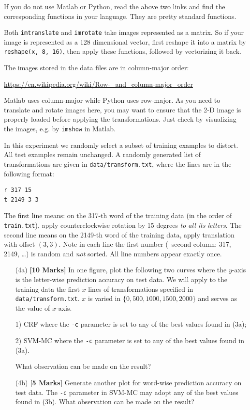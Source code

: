 \documentclass[11pt]{report}
\begin{document}
If you do not use Matlab or Python, read the above two links and find the corresponding functions in your language.  
They are pretty standard functions.	

Both \verb#imtranslate# and \verb#imrotate# take images represented as a matrix.
So if your image is represented as a 128 dimensional vector,
first reshape it into a matrix by \verb#reshape(x, 8, 16)#,
then apply these functions,
followed by vectorizing it back.

The images stored in the data files are in column-major order:

\href{https://en.wikipedia.org/wiki/Row-_and_column-major_order}{https://en.wikipedia.org/wiki/Row-\_and\_column-major\_order}

Matlab uses column-major while Python uses row-major.
As you need to translate and rotate images here, 
you may want to ensure that the 2-D image is properly loaded before applying the transformations.  
Just check by visualizing the images, e.g. by \verb#imshow# in Matlab.	

In this experiment
we randomly select a subset of training examples to distort.
All test examples remain unchanged.
A randomly generated list of transformations are given in \verb#data/transform.txt#, where the lines are in the following format:
%
\begin{verbatim}
r 317 15
t 2149 3 3
\end{verbatim}
The first line means: on the 317-th word of the training data (in the order of \verb#train.txt#),
apply counterclockwise rotation by 15 degrees \emph{to all its letters}.
The second line means on the 2149-th word of the training data, apply translation with offset $(3,3)$.
Note in each line the first number (\ie\ second column: 317, 2149, \ldots) is random and \emph{not} sorted.
All line numbers appear exactly once.

\begin{itemize}
	\item[(4a)] {\bf [10 Marks]} In one figure, plot the following two curves where the $y$-axis is the letter-wise prediction accuracy on test data.  We will apply to the training data the first $x$ lines of transformations specified in \verb#data/transform.txt#.  $x$ is varied in $\{0, 500, 1000, 1500, 2000\}$ and serves as the value of $x$-axis.
	
	1) CRF where the \verb#-c# parameter is set to any of the best values found in (3a);
	
	2) SVM-MC where the \verb#-c# parameter is set to any of the best values found in (3a).
	
	What observation can be made on the result?
	
	\item[(4b)] {\bf [5 Marks]}  Generate another plot for word-wise prediction accuracy on test data.  The \verb#-c# parameter in SVM-MC may adopt any of the best values found in (3b).
	What observation can be made on the result?
	
\end{itemize}
\end{document}
